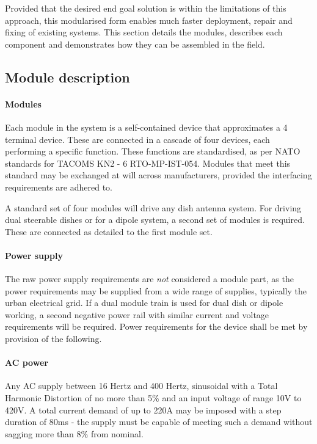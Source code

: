 \documentclass[review]{elsarticle}
\begin{document}
Provided that the desired end goal solution is within the limitations of this approach, this modularised form enables much faster deployment, repair and fixing of existing systems. This section details the modules, describes each component and demonstrates how they can be assembled in the field.

\subsection{Module description} 
\paragraph{Modules} Each module in the system is a self-contained device that approximates a 4 terminal device. These are connected in a cascade of four devices, each performing a specific function. These functions are standardised, as per NATO standards for TACOMS KN2 - 6 RTO-MP-IST-054. Modules that meet this standard may be exchanged at will across manufacturers, provided the interfacing requirements are adhered to.

A standard set of four modules will drive any dish antenna system. For driving dual steerable dishes or for a dipole system, a second set of modules is required. These are connected as detailed to the first module set.

\paragraph{Power supply} The raw power supply requirements are \emph{not} considered a module part, as the power requirements may be supplied from a wide range of supplies, typically the urban electrical grid. If a dual module train is used for dual dish or dipole working, a second negative power rail with similar current and voltage requirements will be required.  Power requirements for the device shall be met by provision of the following.

\paragraph{AC power} Any AC supply between 16 Hertz and 400 Hertz, sinusoidal with a Total Harmonic Distortion of no more than 5\% and an input voltage of range 10V to 420V. A total current demand of up to 220A may be imposed with a step duration of 80ms - the supply must be capable of meeting such a demand without sagging more than 8\% from nominal.
\end{document}
